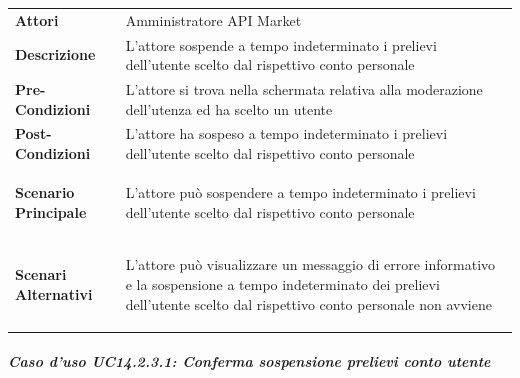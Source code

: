 \begin{minipage}{\linewidth}
	\begin{tabular}{ l | p{11cm}}
		\hline
		\rowcolor{Gray}
		\multicolumn{2}{c}{UC14.2.3 - Sospensione prelievi conto utente} \\
		\hline
		\textbf{Attori} & Amministratore API Market \\
		\textbf{Descrizione} & L'attore sospende a tempo indeterminato i prelievi dell'utente scelto dal rispettivo conto personale \\
		\textbf{Pre-Condizioni} & L'attore si trova nella schermata relativa alla moderazione dell'utenza ed ha scelto un utente \\
		\textbf{Post-Condizioni} & L'attore ha sospeso a tempo indeterminato i prelievi dell'utente scelto dal rispettivo conto personale \\
		\textbf{Scenario Principale} & 
		\begin{enumerate*}[label=(\arabic*.),itemjoin={\newline}]
			\item L'attore può sospendere a tempo indeterminato i prelievi dell'utente scelto dal rispettivo conto personale
		\end{enumerate*}\\
		\textbf{Scenari Alternativi} & 
		\begin{enumerate*}[label=(\arabic*.),itemjoin={\newline}]
			\item L'attore può visualizzare un messaggio di errore informativo e la sospensione a tempo indeterminato dei prelievi dell'utente scelto dal rispettivo conto personale non avviene
		\end{enumerate*}\\
	\end{tabular}
\end{minipage}

\subparagraph{Caso d'uso UC14.2.3.1: Conferma sospensione prelievi conto utente}
\label{UC14_2_3_1}

